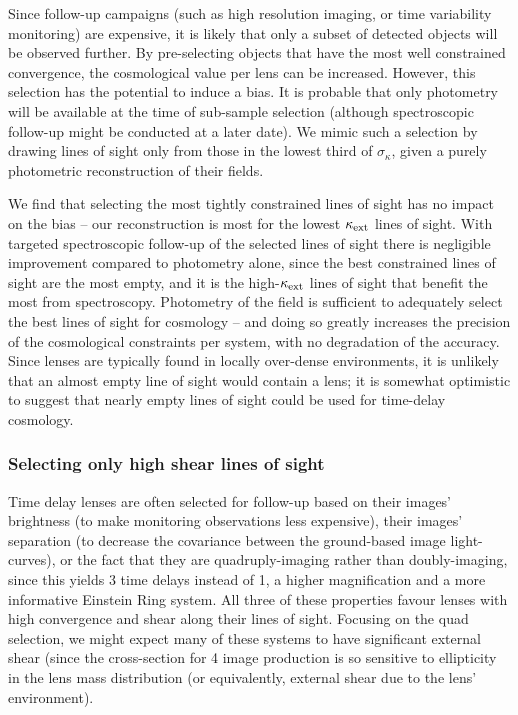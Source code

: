\documentclass[useAMS,usenatbib]{mn2e}
\begin{document}
Since follow-up campaigns (such as high resolution imaging, or time
variability monitoring) are expensive, it is likely that only a subset of
detected objects will be observed further. By pre-selecting objects that have 
the most well constrained convergence, the cosmological value per lens can be
increased. However, this selection has the potential to induce a bias. It is
probable that only photometry will be available at the time of sub-sample
selection (although spectroscopic follow-up might be conducted at a later
date). We mimic such a selection by drawing lines of sight only from those in
the lowest third of $\sigma_{\kappa}$, given a purely photometric
reconstruction of their fields. 

We find that selecting the most tightly constrained lines of sight has no impact on the
bias -- our reconstruction is most \succesful for the lowest
$\kappa_{\rm ext}$ lines of sight. With targeted spectroscopic follow-up of the selected lines of sight
there is negligible improvement compared to photometry alone, since the best constrained lines of sight are
the most empty, and it is the high-$\kappa_{\rm ext}$ lines of sight that benefit the
most from spectroscopy. Photometry of the field is sufficient to adequately
select the best lines of sight for cosmology -- and doing so greatly increases
 the precision of the cosmological constraints per system, with no degradation of the accuracy.
Since lenses are typically found in locally over-dense environments, it is unlikely that 
an almost empty line of sight would contain a lens; it is somewhat optimistic to 
suggest that nearly empty lines of sight could be used for time-delay cosmology. 


\subsubsection{Selecting only high shear lines of sight}
\label{sec:bias:tightPDF}

Time delay lenses are often selected for follow-up based on their images'
brightness (to make monitoring observations less expensive), their images'
separation (to decrease the covariance between the ground-based image
light-curves), or the fact that they are quadruply-imaging rather than
doubly-imaging, since this yields 3 time delays instead of 1, a higher
magnification and a more informative Einstein Ring system. All three of these
properties favour lenses with high convergence and shear along their lines of
sight. Focusing on the quad selection, we might expect many of these systems
to have significant external shear (since the cross-section for 4 image
production is so sensitive to ellipticity in the lens mass distribution (or
equivalently, external shear due to the lens' environment). 
\end{document}
